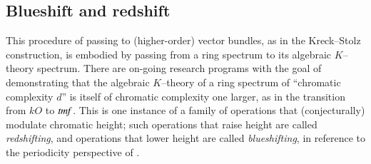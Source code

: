 \subsection*{Blueshift and redshift}

This procedure of passing to (higher-order) vector bundles, as in the Kreck--Stolz construction, is embodied by passing from a ring spectrum to its algebraic $K$--theory spectrum.  There are on-going research programs with the goal of demonstrating that the algebraic $K$--theory of a ring spectrum of ``chromatic complexity $d$'' is itself of chromatic complexity one larger, as in the transition from $kO$ to $\mathit{tmf}$.  This is one instance of a family of operations that (conjecturally) modulate chromatic height; such operations that raise height are called \textit{redshifting}, and operations that lower height are called \textit{blueshifting}, in reference to the periodicity perspective of .

